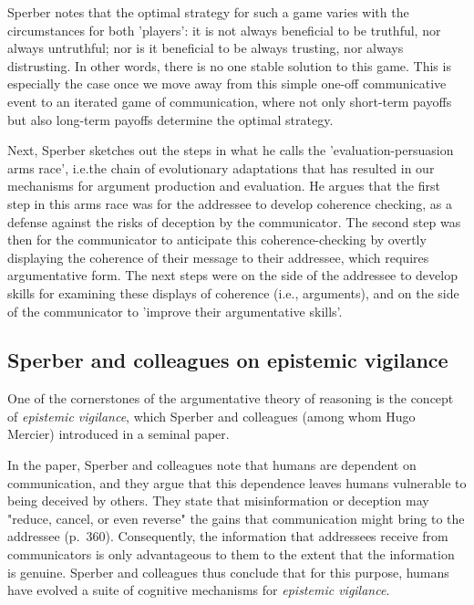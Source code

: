 Sperber notes that the optimal strategy for such a game varies with the circumstances for both 'players': it is not always beneficial to be truthful, nor always untruthful; nor is it beneficial to be always trusting, nor always distrusting. In other words, there is no one stable solution to this game.
This is especially the case once we move away from this simple one-off communicative event to an iterated game of communication, where not only short-term payoffs but also long-term payoffs determine the optimal strategy.


Next, Sperber sketches out the steps in what he calls the 'evaluation-persuasion arms race', i.e.\@ the chain of evolutionary adaptations that has resulted in our mechanisms for argument production and evaluation.
He argues that the first step in this arms race was for the addressee to develop coherence checking, as a defense against the risks of deception by the communicator. The second step was then for the communicator to anticipate this coherence-checking by overtly displaying the coherence of their message to their addressee, which requires argumentative form. The next steps were on the side of the addressee to develop skills for examining these displays of coherence (i.e., arguments), and on the side of the communicator to 'improve their argumentative skills'.


\subsection{Sperber and colleagues on epistemic vigilance}
\label{sec:Sperber10}


One of the cornerstones of the argumentative theory of reasoning is the concept of \emph{epistemic vigilance}, which Sperber and colleagues (among whom Hugo Mercier) introduced in a seminal \citeyear{Sperber10} paper.

In the paper, Sperber and colleagues note that humans are dependent on communication, and they argue that this dependence leaves humans vulnerable to being deceived by others.
They state that misinformation or deception may "reduce, cancel, or even reverse" the gains that communication might bring to the addressee (p.~360).
Consequently, the information that addressees receive from communicators is only advantageous to them to the extent that the information is genuine.
Sperber and colleagues thus conclude that for this purpose, humans have evolved a suite of cognitive mechanisms for \emph{epistemic vigilance}.

